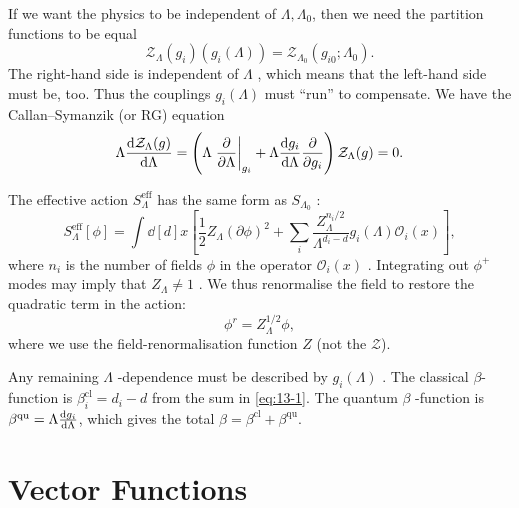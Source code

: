 If we want the physics to be independent of $\Lambda, \Lambda_0$, then  we need the partition functions to be equal
\begin{equation}
  \mathcal{Z}_\Lambda(g_i) (g_i (\Lambda)) = \mathcal{Z}_{\Lambda_0} (g_{i0}; \Lambda_0).
\end{equation}
The right-hand side is independent of $\Lambda$ , which means that the left-hand side must be, too.
Thus the couplings $g_i(\Lambda)$  must ``run'' to compensate.
We have the Callan--Symanzik (or RG) equation
\begin{equation}
  \Lambda \dv{\mathcal{Z}_\Lambda(g)}{\Lambda} = \left( \Lambda \left.\frac{\partial }{\partial \Lambda}\right\rvert_{g_i} + \Lambda \dv{g_i}{\Lambda} \frac{\partial }{\partial g_i} \right) \mathcal{Z}_\Lambda (g) = 0.
\end{equation}

The effective action $S_\Lambda^{\text{eff}}$  has the same form as $S_{\Lambda_0}$ :
\begin{equation}
  \label{eq:13-1}
  S_\Lambda^{ \text{eff}} [\phi] = \int \dd[d]{x} \left[ \frac{1}{2} Z_\Lambda (\partial \phi)^2 + \sum_{i} \frac{Z_\Lambda^{n_i / 2}}{\Lambda^{d_i - d}} g_i(\Lambda) \mathcal{O}_i(x) \right],
\end{equation}
where $n_i$  is the number of fields $\phi$  in the operator $\mathcal{O}_i(x)$ .
Integrating out $\phi^+$  modes may imply that $Z_\Lambda \neq 1$ .  We thus renormalise the field to restore the quadratic term in the action:
\begin{equation}
  \phi^r = Z^{1 / 2}_\Lambda \phi,
\end{equation}
where we use the field-renormalisation function $Z$ (not the $\mathcal{Z}$).

Any remaining $\Lambda$ -dependence must be described by $g_i(\Lambda)$ .
The classical $\beta$-function is $\beta_i^{\text{cl}} = d_i - d$ from the sum in \eqref{eq:13-1}. The quantum $\beta$ -function is $\beta^{\text{qu}} = \Lambda \dv{g_i}{\Lambda}$, which gives the total $\beta = \beta^{\text{cl}} + \beta^{\text{qu}}$.

\section{Vector Functions}%
\label{sec:vector_functions}


